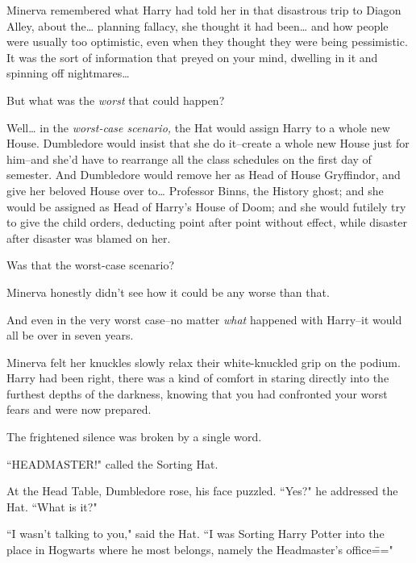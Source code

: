 Minerva remembered what Harry had told her in that disastrous trip to Diagon Alley, about the{\ldots} planning fallacy, she thought it had been{\ldots} and how people were usually too optimistic, even when they thought they were being pessimistic. It was the sort of information that preyed on your mind, dwelling in it and spinning off nightmares{\ldots}

But what was the \emph{worst} that could happen?

Well{\ldots} in the \emph{worst-case scenario,} the Hat would assign Harry to a whole new House. Dumbledore would insist that she do it\---create a whole new House just for him\---and she'd have to rearrange all the class schedules on the first day of semester. And Dumbledore would remove her as Head of House Gryffindor, and give her beloved House over to{\ldots} Professor Binns, the History ghost; and she would be assigned as Head of Harry's House of Doom; and she would futilely try to give the child orders, deducting point after point without effect, while disaster after disaster was blamed on her.

Was that the worst-case scenario?

Minerva honestly didn't see how it could be any worse than that.

And even in the very worst case\---no matter \emph{what} happened with Harry\---it would all be over in seven years.

Minerva felt her knuckles slowly relax their white-knuckled grip on the podium. Harry had been right, there was a kind of comfort in staring directly into the furthest depths of the darkness, knowing that you had confronted your worst fears and were now prepared.

The frightened silence was broken by a single word.

``HEADMASTER!" called the Sorting Hat.

At the Head Table, Dumbledore rose, his face puzzled. ``Yes?" he addressed the Hat. ``What is it?"

``I wasn't talking to you," said the Hat. ``I was Sorting Harry Potter into the place in Hogwarts where he most belongs, namely the Headmaster's office\==="

